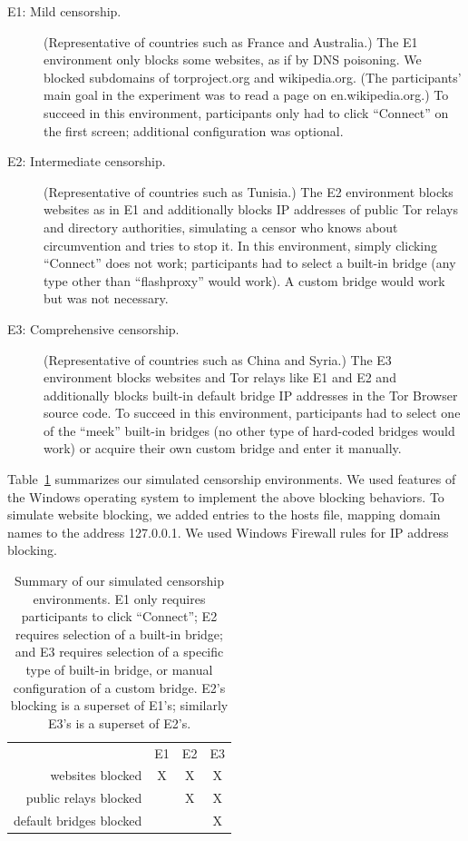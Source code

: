 \documentclass[USenglish,oneside,twocolumn]{article}
\begin{document}
\begin{description}
\item [E1: Mild censorship.]
(Representative of countries such as France and Australia.)
The E1 environment only blocks some websites,
as if by DNS poisoning.
We blocked subdomains of torproject.org
and wikipedia.org.
(The participants' main goal in the experiment was to read a page on en.wikipedia.org.)
To succeed in this environment,
participants only had to click ``Connect'' on the first screen;
additional configuration was optional.

\item [E2: Intermediate censorship.]
(Representative of countries such as Tunisia.)
The E2 environment blocks websites as in E1 and
additionally blocks IP addresses of public Tor relays
and directory authorities, simulating a censor who knows
about circumvention and tries to stop it.
In this environment, simply clicking ``Connect'' does not work;
participants had to select a built-in bridge
(any type other than ``flashproxy'' would work).
A custom bridge would work but was not necessary.

\item [E3: Comprehensive censorship.]
(Representative of countries such as China and Syria.)
The E3 environment blocks websites and Tor relays like E1 and E2
and additionally blocks built-in default bridge IP addresses in the Tor Browser source code.
To succeed in this environment, participants had to select
one of the ``meek'' built-in bridges (no other type of hard-coded bridges would work)
or acquire their own custom bridge and enter it manually.
\end{description}

\smallskip

Table~\ref{tab:environments} summarizes our simulated censorship
environments. We used features of the Windows operating system 
to implement the above blocking behaviors.
To simulate website blocking, we added entries to the hosts file,
mapping domain names to the address 127.0.0.1.
We used Windows Firewall rules for IP address blocking.

\begin{table}
\centering
\begin{tabular}{r c c c}
& E1 & E2 & E3 \\
websites blocked & X & X & X \\
public relays blocked & & X & X \\
default bridges blocked & & & X \\
\end{tabular}
\caption{
Summary of our simulated censorship environments.
E1 only requires participants to click ``Connect'';
E2 requires selection of a built-in bridge;
and E3 requires selection of a specific type of built-in bridge,
or manual configuration of a custom bridge.
E2's blocking is a superset of E1's;
similarly E3's is a superset of E2's.
}
\label{tab:environments}
\end{table}
\end{document}
